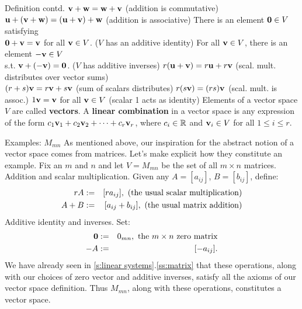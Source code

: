 \begin{frame}{Definition contd.}
\bb[(a)]
\ii ${\mathbf v}+{\mathbf w}={\mathbf w}+{\mathbf v}$ \hfill (addition is commutative)
\pause\ii ${\mathbf u}+({\mathbf v}+{\mathbf w})=({\mathbf u}+{\mathbf v})+{\mathbf w}$ \hfill (addition is associative)
\pause\ii There is an element ${\mathbf 0}\in V$ satisfying\\
 ${\mathbf 0}+{\mathbf v}={\mathbf v}$ for all ${\mathbf v}\in V$. \hfill ($V$ has an additive identity)
 \pause\ii For all ${\mathbf v}\in V$, there is an element $-{\mathbf v}\in V$\\
 s.t. ${\mathbf v}+(-{\mathbf v})={\mathbf 0}$. \hfill ($V$ has additive inverses)
\pause\ii $r({\mathbf u}+{\mathbf v})=r{\mathbf u}+r{\mathbf v}$ \hfill (scal. mult. distributes over vector sums)\\
\pause\ii $(r+s){\mathbf v}=r{\mathbf v}+s{\mathbf v}$ \hfill (sum of scalars distributes)
\pause\ii $r(s{\mathbf v})=(rs){\mathbf v}$ \hfill (scal. mult. is assoc.)
\pause\ii $1{\mathbf v}={\mathbf v}$ for all ${\mathbf v}\in V$ \hfill (scalar 1 acts as identity)
\ee
Elements of a vector space $V$ are called {\bf vectors}.
\bpause 
A {\bf linear combination} in a vector space is any expression of the form $c_1{\mathbf v}_1+c_2{\mathbf v}_2+\cdots +c_r{\mathbf v}_r$, where $c_i\in{\mathbb R}$ and ${\mathbf v}_i\in V$ for all $1\leq i\leq r$. 
\end{frame}
\begin{frame}{Examples: \alert{$M_{mn}$}}
As mentioned above, our inspiration for the abstract notion of a vector space comes from matrices. Let's make explicit how they constitute an example. 
\bspace
Fix an $m$ and $n$ and let $V=M_{mn}$ be the set of all $m\times n$ matrices. 
\bpause
\alert{Addition and scalar multiplication}.
Given any $A=[a_{ij}]$, $B=[b_{ij}]$, define:
\begin{eqnarray*}
rA&:=&[ra_{ij}], \hfill \text{ (the usual scalar multiplication)}\\
A+B&:=&[a_{ij}+b_{ij}], \hfill \text{ (the usual matrix addition)}
\end{eqnarray*}
\pause 
\alert{Additive identity and inverses}.
Set: 
\begin{eqnarray*}
{\mathbf 0}&:=&0_{mn}, \text{ the $m\times n$ zero matrix}\\
-A&:=&[-a_{ij}].
\end{eqnarray*}
\pause We have already seen in \ref{s:linear systems}.\ref{ss:matrix} that these operations, along with our choices of zero vector and additive inverses, satisfy all the axioms of our vector space definition. Thus $M_{mn}$, along with these operations, constitutes a vector space. 
\end{frame}
